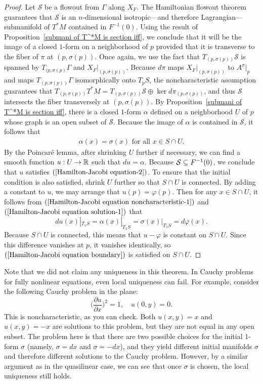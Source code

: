 \begin{proof}
Let $\mathcal{S}$ be a flowout from $\Gamma$ along $X_F$. The Hamiltonian flowout theorem guarantees that $\mathcal{S}$ is an $n$-dimensional isotropic---and therefore Lagrangian---submanifold of $T^*M$ contained in $F^{-1}(0)$. Using the result of Proposition~\ref{submani of T^*M is section iff}, we conclude that it will be the image of a closed $1$-form on a neighborhood of $p$ provided that it is transverse to the fiber of $\pi$ at $(p,\sigma(p))$. Once again, we use the fact that $T_{(p,\sigma(p))}\mathcal{S}$ is spanned by $T_{(p,\sigma(p)}\Gamma$ and $X_F|_{(p,\sigma(p))}$. Because $d\pi$ maps $X_F|_{(p,\sigma(p))}$ to $A^\sigma|_p$ and maps $T_{(p,\sigma(p))}\Gamma$ isomorphically onto $T_pS$, the noncharacteristic assumption guarantees that $T_{(p,\sigma(p))}T^*M=T_{(p,\sigma(p))}\mathcal{S}\oplus\ker d\pi_{(p,\sigma(p))}$, and thus $\mathcal{S}$ intersects the fiber transversely at $(p,\sigma(p))$. By Proposition~\ref{submani of T^*M is section iff}, there is a closed $1$-form $\alpha$ defined on a neighborhood $U$ of $p$ whose graph is an open subset of $\mathcal{S}$. Because the image of $\alpha$ is contained in $\mathcal{S}$, it follows that
\begin{align}\label{Hamilton-Jacobi equation solution-1}
\alpha(x)=\sigma(x)\text{ for all }x\in S\cap U.
\end{align}
By the Poincar\'e lemma, after shrinking $U$ further if necessary, we can find a smooth function $u:U\to\mathbb{R}$ such that $du=\alpha$. Because $\mathcal{S}\subseteq F^{-1}(0)$, we conclude that $u$ satisfies $(\ref{Hamilton-Jacobi equation-2})$. To ensure that the initial condition is also satisfied, shrink $U$ further so that $S\cap U$ is connected. By adding a constant to $u$, we may arrange that $u(p)=\varphi(p)$. Then for any $x\in S\cap U$, it follows from $(\ref{Hamilton-Jacobi equation noncharacteristic-1})$ and $(\ref{Hamilton-Jacobi equation solution-1})$ that
\[du(x)|_{T_xS}=\alpha(x)|_{T_xS}=\sigma(x)|_{T_xS}=d\varphi(x).\]
Because $S\cap U$ is connected, this means that $u-\varphi$ is constant on $S\cap U$. Since this difference vanishes at $p$, it vanishes identically, so $(\ref{Hamilton-Jacobi equation boundary})$ is satisfied on $S\cap U$.
\end{proof}
Note that we did not claim any uniqueness in this theorem. In Cauchy problems for fully nonlinear equations, even local uniqueness can fail. For example, consider the following Cauchy problem in the plane:
\[\Big(\frac{\partial u}{\partial x}\Big)^2=1,\quad u(0,y)=0.\]
This is noncharacteristic, as you can check. Both $u(x,y)=x$ and $u(x,y)=-x$ are solutions to this problem, but they are not equal in any open subset. The problem here is that there are two possible choices for the initial $1$-form $\sigma$ (namely, $\sigma=dx$ and $\sigma=-dx$), and they yield different initial manifolds $\sigma$ and therefore different solutions to the Cauchy problem. However, by a similar argument as in the quasilinear case, we can see that once $\sigma$ is chosen, the local uniqueness still holds.
